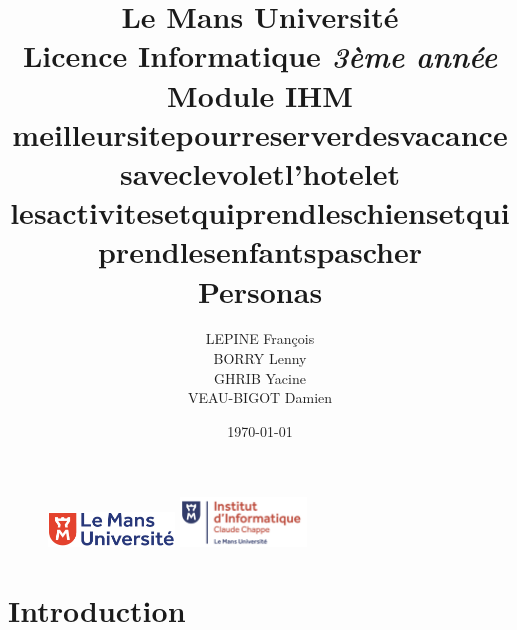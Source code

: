 \documentclass[a4paper,11pt]{article}
\begin{document}
\begin{figure}
\includegraphics[width=0.3\textwidth]{logolemansU.png}
\hspace{150pt} 
\includegraphics[width=0.3\textwidth]{logo_ic2.png} 
\end{figure}

\title{\textbf{\color{blue} Le Mans Université}\color{black}
\\ Licence Informatique \textit{3ème année}
\\ Module IHM
\\ meilleursitepourreserverdesvacancesaveclevoletl'hotelet\\lesactivitesetquiprendleschiensetquiprendlesenfantspascher
\\ \textbf{Personas}}
\author{LEPINE François\\BORRY Lenny\\GHRIB Yacine\\VEAU-BIGOT Damien}
\date{\today} 
\maketitle 
\newpage

\tableofcontents
\newpage


\section{Introduction}
\end{document}
